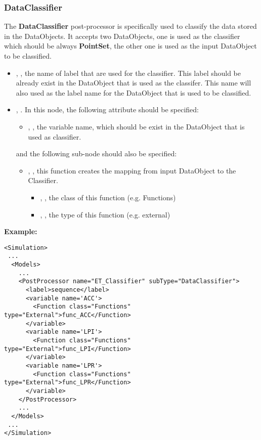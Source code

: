 
\subsubsection{DataClassifier}
\label{DataClassifierPP}
The \textbf{DataClassifier} post-processor is specifically used to classify the data stored in the DataObjects. It
accepts two DataObjects, one is used as the classifier which should be always \textbf{PointSet}, the other one is used
as the input DataObject to be classified. 
%
%
\begin{itemize}
  \item {}, , the name of label that are used for the classifier. This
    label should be already exist in the DataObject that is used as the classifer. This name will also used as
    the label name for the DataObject that is used to be classified.
  \item {}, . In this node, the following attribute should be specified: 
    \begin{itemize}
      \item {}, , the variable name, which should be exist in
        the DataObject that is used as classifier.
    \end{itemize}
    and the following sub-node should also be specified:
    \begin{itemize}
      \item {}, , this function creates the mapping from input DataObject
        to the Classifier.
        \begin{itemize}
          \item {}, , the class of this function (e.g. Functions)
          \item {}, , the type of this function (e.g. external)
        \end{itemize}
    \end{itemize}
\end{itemize}

\textbf{Example:}

\begin{lstlisting}[style=XML]
<Simulation>
 ...
  <Models>
    ...
    <PostProcessor name="ET_Classifier" subType="DataClassifier">
      <label>sequence</label>
      <variable name='ACC'>
        <Function class="Functions" type="External">func_ACC</Function>
      </variable>
      <variable name='LPI'>
        <Function class="Functions" type="External">func_LPI</Function>
      </variable>
      <variable name='LPR'>
        <Function class="Functions" type="External">func_LPR</Function>
      </variable>
    </PostProcessor>
    ...
  </Models>
 ...
</Simulation>
\end{lstlisting}

